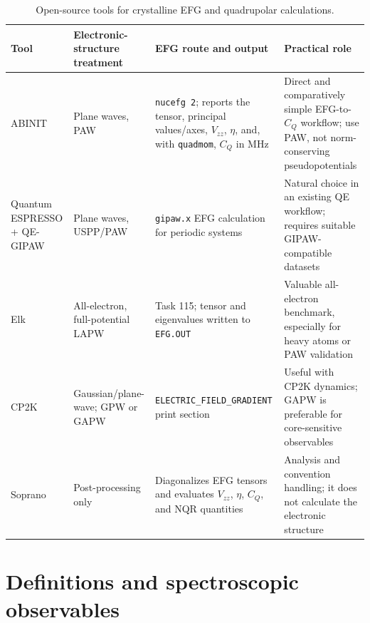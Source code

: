 \documentclass[10pt]{article}
\begin{document}
\begin{table}[h!]
\centering
\caption{Open-source tools for crystalline EFG and quadrupolar calculations.}
\label{tab:tools}
\footnotesize
\begin{tabularx}{\textwidth}{@{}>{\raggedright\arraybackslash}p{}>{\raggedright\arraybackslash}p{}>{\raggedright\arraybackslash}X>{\raggedright\arraybackslash}p{}@{}}
\toprule
\textbf{Tool} & \textbf{Electronic-structure treatment} & \textbf{EFG route and output} & \textbf{Practical role} \\
\midrule
ABINIT & Plane waves, PAW & \texttt{nucefg 2}; reports the tensor, principal values/axes, $V_{zz}$, $\eta$, and, with \texttt{quadmom}, $C_Q$ in MHz \cite{abinitEFG} & Direct and comparatively simple EFG-to-$C_Q$ workflow; use PAW, not norm-conserving pseudopotentials \\
Quantum ESPRESSO + QE-GIPAW & Plane waves, USPP/PAW & \texttt{gipaw.x} EFG calculation for periodic systems \cite{qegipaw} & Natural choice in an existing QE workflow; requires suitable GIPAW-compatible datasets \\
Elk & All-electron, full-potential LAPW & Task 115; tensor and eigenvalues written to \texttt{EFG.OUT} \cite{elkmanual} & Valuable all-electron benchmark, especially for heavy atoms or PAW validation \\
CP2K & Gaussian/plane-wave; GPW or GAPW & \texttt{ELECTRIC\_FIELD\_GRADIENT} print section \cite{cp2kmanual} & Useful with CP2K dynamics; GAPW is preferable for core-sensitive observables \\
Soprano & Post-processing only & Diagonalizes EFG tensors and evaluates $V_{zz}$, $\eta$, $C_Q$, and NQR quantities \cite{soprano} & Analysis and convention handling; it does not calculate the electronic structure \\
\bottomrule
\end{tabularx}
\end{table}

\section{Definitions and spectroscopic observables}
\end{document}
